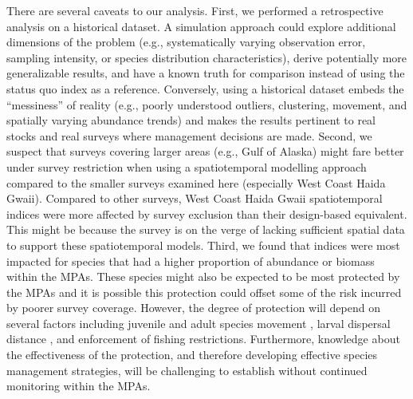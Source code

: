 \documentclass[12pt]{article}
\newcommand{\R}[1]{\label{#1}\linelabel{#1}}
\begin{document}
\begin{spacing}{1.4}
There are several caveats to our analysis.
First, we performed a retrospective analysis on a historical dataset.
A simulation approach \citep[e.g.,][]{schnute2003, regular2020, yalcin2023} could explore additional dimensions of the problem (e.g., systematically varying observation error, sampling intensity, or species distribution characteristics), derive potentially more generalizable results, and have a known truth for comparison instead of using the status quo index as a reference.
Conversely, using a historical dataset embeds the ``messiness'' of reality (e.g., poorly understood outliers, clustering, movement, and spatially varying abundance trends) and makes the results pertinent to real stocks and real surveys where management decisions are made.
Second, we suspect that surveys covering larger areas (e.g., Gulf of Alaska) might fare better under survey restriction when using a spatiotemporal modelling approach compared to the smaller surveys examined here (especially West Coast Haida Gwaii).
Compared to other surveys, West Coast Haida Gwaii spatiotemporal indices were more affected by survey exclusion than their design-based equivalent.
This might be because the survey is on the verge of lacking sufficient spatial data to support these spatiotemporal models.
Third, we found that indices were most impacted for species that had a higher proportion of abundance or biomass within the MPAs.
These species might also be expected to be most protected by the MPAs and it is possible this protection could offset some of the risk incurred by poorer survey coverage.
However, the degree of protection will depend on several factors including juvenile and adult species movement \citep[e.g.,][]{gerber2003, gruss2011}, larval dispersal distance \citep[e.g.,][]{botsford2003, planes2009}, and \R{B4} enforcement of fishing restrictions.
\R{E5} Furthermore, knowledge about the effectiveness of the protection, and therefore developing effective species management strategies, will be challenging to establish without continued monitoring within the MPAs.



\end{spacing}
\end{document}
